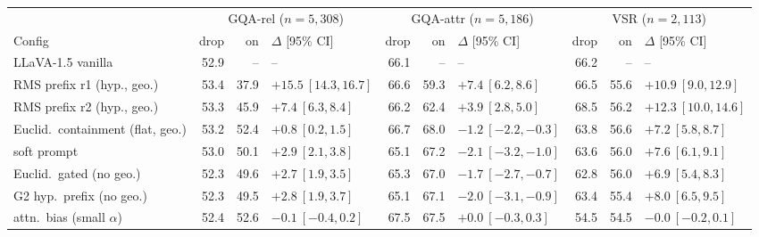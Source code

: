 \begin{tabular}{@{}l rrl rrl rrl@{}}
\toprule
 & \multicolumn{3}{c}{GQA-rel ($n{=}5{,}308$)} & \multicolumn{3}{c}{GQA-attr ($n{=}5{,}186$)} & \multicolumn{3}{c}{VSR ($n{=}2{,}113$)} \\
\cmidrule(lr){2-4}\cmidrule(lr){5-7}\cmidrule(lr){8-10}
Config & drop & on & $\Delta$ [95\% CI] & drop & on & $\Delta$ [95\% CI] & drop & on & $\Delta$ [95\% CI] \\
\midrule
LLaVA-1.5 vanilla & 52.9 & -- & -- & 66.1 & -- & -- & 66.2 & -- & -- \\
RMS prefix r1 (hyp., geo.) & 53.4 & 37.9 & $+15.5\ [14.3, 16.7]$ & 66.6 & 59.3 & $+7.4\ [6.2, 8.6]$ & 66.5 & 55.6 & $+10.9\ [9.0, 12.9]$ \\
RMS prefix r2 (hyp., geo.) & 53.3 & 45.9 & $+7.4\ [6.3, 8.4]$ & 66.2 & 62.4 & $+3.9\ [2.8, 5.0]$ & 68.5 & 56.2 & $+12.3\ [10.0, 14.6]$ \\
Euclid.\ containment (flat, geo.) & 53.2 & 52.4 & $+0.8\ [0.2, 1.5]$ & 66.7 & 68.0 & $-1.2\ [-2.2, -0.3]$ & 63.8 & 56.6 & $+7.2\ [5.8, 8.7]$ \\
soft prompt & 53.0 & 50.1 & $+2.9\ [2.1, 3.8]$ & 65.1 & 67.2 & $-2.1\ [-3.2, -1.0]$ & 63.6 & 56.0 & $+7.6\ [6.1, 9.1]$ \\
Euclid.\ gated (no geo.) & 52.3 & 49.6 & $+2.7\ [1.9, 3.5]$ & 65.3 & 67.0 & $-1.7\ [-2.7, -0.7]$ & 62.8 & 56.0 & $+6.9\ [5.4, 8.3]$ \\
G2 hyp.\ prefix (no geo.) & 52.3 & 49.5 & $+2.8\ [1.9, 3.7]$ & 65.1 & 67.1 & $-2.0\ [-3.1, -0.9]$ & 63.4 & 55.4 & $+8.0\ [6.5, 9.5]$ \\
attn.\ bias (small $\alpha$) & 52.4 & 52.6 & $-0.1\ [-0.4, 0.2]$ & 67.5 & 67.5 & $+0.0\ [-0.3, 0.3]$ & 54.5 & 54.5 & $-0.0\ [-0.2, 0.1]$ \\
\bottomrule
\end{tabular}
